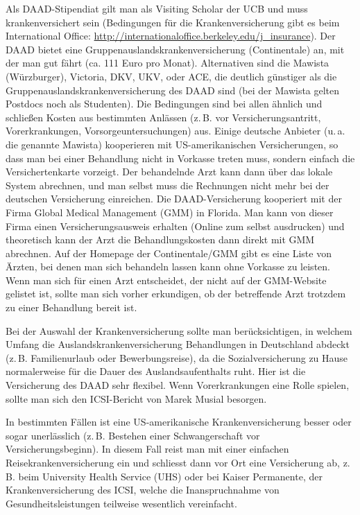 \documentclass[a4paper]{scrreprt}
\begin{document}
Als DAAD-Stipendiat gilt man als Visiting Scholar der UCB und muss krankenversichert sein (Bedingungen für die Krankenversicherung gibt es beim International Office:  \url{http://internationaloffice.berkeley.edu/j\_insurance}). Der DAAD bietet eine Gruppenauslandskrankenversicherung (Continentale) an, mit der man gut fährt (ca. 111 Euro pro Monat). Alternativen sind die Mawista (Würzburger), Victoria, DKV, UKV, oder ACE, die deutlich günstiger als die Gruppenauslandskrankenversicherung des DAAD sind (bei der Mawista gelten Postdocs noch als Studenten). Die Bedingungen sind bei allen ähnlich und schließen Kosten aus bestimmten Anlässen (z.\,B. vor Versicherungsantritt, Vorerkrankungen, Vorsorgeuntersuchungen) aus. Einige deutsche Anbieter (u.\,a. die genannte Mawista) kooperieren mit US-amerikanischen Versicherungen, so dass man bei einer Behandlung nicht in Vorkasse treten muss, sondern einfach die Versichertenkarte vorzeigt. Der behandelnde Arzt kann dann über das lokale System abrechnen, und man selbst muss die Rechnungen nicht mehr bei der deutschen Versicherung einreichen. Die DAAD-Versicherung kooperiert mit der Firma Global Medical Management (GMM) in Florida. Man kann von dieser Firma einen Versicherungsausweis erhalten (Online zum selbst ausdrucken) und theoretisch kann der Arzt die Behandlungskosten dann direkt mit GMM abrechnen. Auf der Homepage der Continentale/GMM gibt es eine Liste von Ärzten, bei denen man sich behandeln lassen kann ohne Vorkasse zu leisten.
Wenn man sich für einen Arzt entscheidet, der nicht auf der GMM-Website gelistet ist, sollte man sich vorher erkundigen, ob der betreffende Arzt trotzdem zu einer Behandlung bereit ist.

Bei der Auswahl der Krankenversicherung sollte man berücksichtigen, in welchem Umfang die Auslandskrankenversicherung Behandlungen in Deutschland abdeckt (z.\,B. Familienurlaub oder Bewerbungsreise), da die Sozialversicherung zu Hause normalerweise für die Dauer des Auslandsaufenthalts ruht. Hier ist die Versicherung des DAAD sehr flexibel. Wenn Vorerkrankungen eine Rolle spielen, sollte man sich den ICSI-Bericht von Marek Musial besorgen.

In bestimmten Fällen ist eine US-amerikanische Krankenversicherung besser oder sogar unerlässlich (z.\,B. Bestehen einer Schwangerschaft vor Versicherungsbeginn). In diesem Fall reist man mit einer einfachen Reisekrankenversicherung ein und schliesst dann vor Ort eine Versicherung ab, z.\,B. beim University Health Service (UHS) oder bei Kaiser Permanente, der Krankenversicherung des ICSI, welche die Inanspruchnahme von Gesundheitsleistungen teilweise wesentlich vereinfacht.
\end{document}
